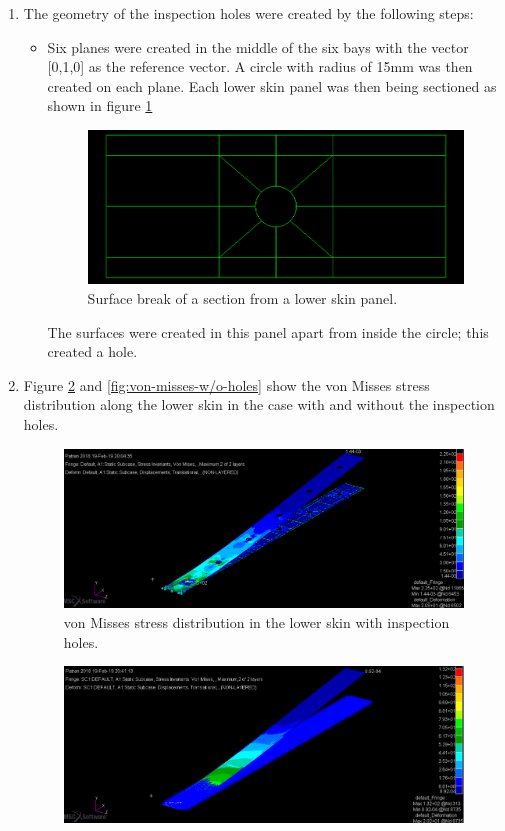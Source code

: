 \documentclass[11pt,a4paper,oneside]{memoir}
\begin{document}
\begin{enumerate}
    \item The geometry of the inspection holes were created by the following steps:
    \begin{itemize}
        \item Six planes were created in the middle of the six bays with the vector [0,1,0] as the reference vector. A circle with radius of 15mm was then created on each plane. Each lower skin panel was then being sectioned as shown in figure \ref{fig:ex.3-surface}
        \begin{figure}[h]
            \centering
            \includegraphics[width = .7\textwidth]{figures/LWR-surface.png}
            \caption{Surface break of a section from a lower skin panel.}
            \label{fig:ex.3-surface}
        \end{figure}
        The surfaces were created  in this panel apart from inside the circle; this created a hole.
    \end{itemize}
    \item Figure \ref{fig:von-misses-holes} and \ref{fig:von-misses-w/o-holes} show the von Misses stress distribution along the lower skin in the case with and without the inspection holes.
    \begin{figure}[h]
        \centering
        \includegraphics[width = .8\textwidth]{figures/stress-distribution.png}
        \caption{von Misses stress distribution in the lower skin with inspection holes.}
        \label{fig:von-misses-holes}
    \end{figure}
    \begin{figure}[h]
        \centering
        \includegraphics[width = .8\textwidth]{figures/one-LWR-skin-von-misses.png}

\end{figure}
\end{enumerate}
\end{document}
